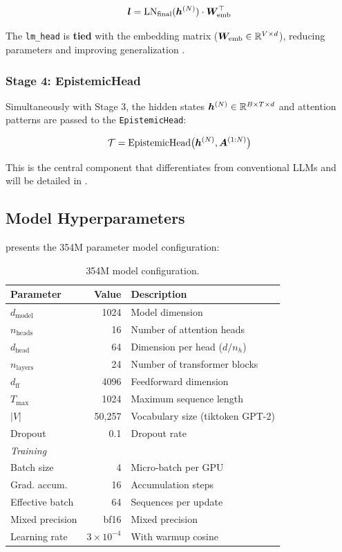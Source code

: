 \begin{equation}
    \bm{l} = \text{LN}_{\text{final}}(\bm{h}^{(N)}) \cdot \bm{W}_{\text{emb}}^\top
\end{equation}

The \texttt{lm\_head} is \textbf{tied} with the embedding matrix
($\bm{W}_{\text{emb}} \in \mathbb{R}^{V \times d}$), reducing parameters and
improving generalization \cite{press2017tying}.

\subsubsection{Stage 4: EpistemicHead}

Simultaneously with Stage 3, the hidden states
$\bm{h}^{(N)} \in \mathbb{R}^{B \times T \times d}$ and attention patterns
are passed to the \texttt{EpistemicHead}:

\begin{equation}
    \mathcal{T} = \text{EpistemicHead}\big(\bm{h}^{(N)}, \bm{A}^{(1:N)}\big)
\end{equation}

This is the central component that differentiates \aletheion{} from
conventional LLMs and will be detailed in .

\subsection{Model Hyperparameters}

 presents the 354M parameter model configuration:

\begin{table}[H]
\centering
\caption{354M model configuration.}
\label{tab:config_base}
\begin{tabular}{lrl}
\toprule
\textbf{Parameter} & \textbf{Value} & \textbf{Description} \\
\midrule
$d_{\text{model}}$ & 1024 & Model dimension \\
$n_{\text{heads}}$ & 16 & Number of attention heads \\
$d_{\text{head}}$ & 64 & Dimension per head ($d/n_h$) \\
$n_{\text{layers}}$ & 24 & Number of transformer blocks \\
$d_{\text{ff}}$ & 4096 & Feedforward dimension \\
$T_{\max}$ & 1024 & Maximum sequence length \\
$|V|$ & 50,257 & Vocabulary size (tiktoken GPT-2) \\
Dropout & 0.1 & Dropout rate \\
\midrule
\multicolumn{3}{l}{\textit{Training}} \\
Batch size & 4 & Micro-batch per GPU \\
Grad. accum. & 16 & Accumulation steps \\
Effective batch & 64 & Sequences per update \\
Mixed precision & bf16 & Mixed precision \\
Learning rate & $3 \times 10^{-4}$ & With warmup cosine \\
\bottomrule
\end{tabular}
\end{table}

